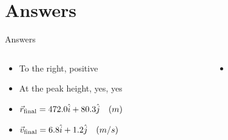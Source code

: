 \documentclass{beamer}
\begin{document}
\section{Answers}

\begin{frame}{Answers}
\begin{columns}[T]
\begin{column}{0.5\textwidth}
\begin{itemize}
\item To the right, positive
\item At the peak height, yes, yes
\item $\vec{r}_{\rm final} = 472.0 \hat{i} + 80.3\hat{j}\quad (m)$
\item $\vec{v}_{\rm final} = 6.8 \hat{i} + 1.2\hat{j}\quad (m/s)$
\end{itemize}
\end{column}
\begin{column}{0.5\textwidth}
\begin{itemize}
\item 
\end{itemize}
\end{column}
\end{columns}
\end{frame}
\end{document}
